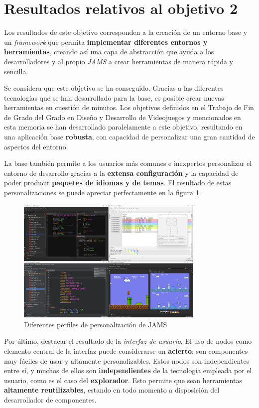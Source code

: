 \section{Resultados relativos al objetivo 2}\label{sec:resultados-relativos-al-objetivo-2}

Los resultados de este objetivo corresponden a la creación de
un entorno base y un \textit{framework} que permita \textbf{implementar
diferentes entornos y herramientas}, creando así una capa
de abstracción que ayuda a los desarrolladores y al propio
\textit{JAMS} a crear herramientas de manera rápida y sencilla.

Se considera que este objetivo se ha conseguido.
Gracias a las diferentes tecnologías que se han desarrollado
para la base, es posible crear nuevas herramientas en cuestión
de minutos.
Los objetivos definidos en el Trabajo de Fin de Grado del Grado en
Diseño y Desarrollo de Videojuegos y mencionados en esta memoria
se han desarrollado paralelamente a este objetivo, resultando
en una aplicación base \textbf{robusta}, con capacidad de personalizar
una gran cantidad de aspectos del entorno.

La base también permite a los usuarios más comunes e
inexpertos personalizar el entorno de desarrollo gracias a la
\textbf{extensa configuración} y la capacidad de poder producir
\textbf{paquetes de idiomas y de temas}.
El resultado de estas personalizaciones se puede apreciar
perfectamente en la figura \ref{fig:jams-collage}.

\begin{figure}[h]
    \centering
    \includegraphics[width=0.8\textwidth]{images/result/jams-collage}
    \caption{Diferentes perfiles de personalización de JAMS}
    \label{fig:jams-collage}
\end{figure}

Por último, destacar el resultado de la \textit{interfaz de usuario}.
El uso de nodos como elemento central de la interfaz puede considerarse
un \textbf{acierto}: son componentes muy fáciles de usar y altamente personalizables.
Estos nodos son independientes entre sí, y muchos de ellos son \textbf{independientes}
de la tecnología empleada por el usuario, como es el caso del \textbf{explorador}.
Esto permite que sean herramientas \textbf{altamente reutilizables}, estando en todo
momento a disposición del desarrollador de componentes.


